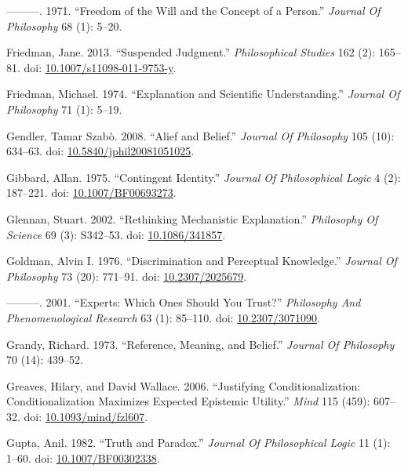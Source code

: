 \documentclass[
  10pt,
  letterpaper,
  DIV=11,
  numbers=noendperiod,
  twoside]{scrartcl}
\newlength{\cslhangindent}
\newenvironment{CSLReferences}[2] %
 {\begin{list}{}{%
  \setlength{\itemindent}{0pt}
  \setlength{\leftmargin}{0pt}
  \setlength{\parsep}{0pt}
  \ifodd #1
   \setlength{\leftmargin}{\cslhangindent}
   \setlength{\itemindent}{-1\cslhangindent}
  \fi
  \setlength{\itemsep}{#2\baselineskip}}}
 {\end{list}}
\begin{document}
\begin{CSLReferences}{1}{0}
---------. 1971. {``Freedom of the Will and the Concept of a Person.''}
\emph{Journal Of Philosophy} 68 (1): 5--20.

Friedman, Jane. 2013. {``Suspended Judgment.''} \emph{Philosophical
Studies} 162 (2): 165--81. doi:
\href{https://doi.org/10.1007/s11098-011-9753-y}{10.1007/s11098-011-9753-y}.

Friedman, Michael. 1974. {``Explanation and Scientific Understanding.''}
\emph{Journal Of Philosophy} 71 (1): 5--19.

Gendler, Tamar Szabò. 2008. {``Alief and Belief.''} \emph{Journal Of
Philosophy} 105 (10): 634--63. doi:
\href{https://doi.org/10.5840/jphil20081051025}{10.5840/jphil20081051025}.

Gibbard, Allan. 1975. {``Contingent Identity.''} \emph{Journal Of
Philosophical Logic} 4 (2): 187--221. doi:
\href{https://doi.org/10.1007/BF00693273}{10.1007/BF00693273}.

Glennan, Stuart. 2002. {``Rethinking Mechanistic Explanation.''}
\emph{Philosophy Of Science} 69 (3): S342--53. doi:
\href{https://doi.org/10.1086/341857}{10.1086/341857}.

Goldman, Alvin I. 1976. {``Discrimination and Perceptual Knowledge.''}
\emph{Journal Of Philosophy} 73 (20): 771--91. doi:
\href{https://doi.org/10.2307/2025679}{10.2307/2025679}.

---------. 2001. {``Experts: Which Ones Should You Trust?''}
\emph{Philosophy And Phenomenological Research} 63 (1): 85--110. doi:
\href{https://doi.org/10.2307/3071090}{10.2307/3071090}.

Grandy, Richard. 1973. {``Reference, Meaning, and Belief.''}
\emph{Journal Of Philosophy} 70 (14): 439--52.

Greaves, Hilary, and David Wallace. 2006. {``Justifying
Conditionalization: Conditionalization Maximizes Expected Epistemic
Utility.''} \emph{Mind} 115 (459): 607--32. doi:
\href{https://doi.org/10.1093/mind/fzl607}{10.1093/mind/fzl607}.

Gupta, Anil. 1982. {``Truth and Paradox.''} \emph{Journal Of
Philosophical Logic} 11 (1): 1--60. doi:
\href{https://doi.org/10.1007/BF00302338}{10.1007/BF00302338}.


\end{CSLReferences}
\end{document}
